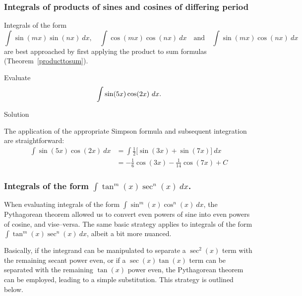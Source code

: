 \subsubsection{Integrals of products of sines and cosines of differing period}
Integrals of the form 
$$\int\sin(mx)\sin(nx)\ dx,\quad \int \cos(mx)\cos(nx)\ dx \quad \text{and}\quad\int \sin(mx)\cos(nx)\ dx$$
are best approached by first applying the product to sum formulas (Theorem~\ref{producttosum}).

\begin{example}\label{ex_trigint4}
Evaluate $$\displaystyle\int\sin(5x)\cos(2x)\ dx.$$

\pagebreak
{}Solution 

The application of the appropriate Simpson formula and subsequent integration are straightforward:
\begin{align*}
\int\sin(5x)\cos(2x)\ dx &= \int \frac12\Big[\sin(3x)+\sin(7x)\Big]\ dx \\[0.2cm]
												&= -\frac16\cos(3x) - \frac1{14}\cos(7x) + C
\end{align*}
\end{example}

\subsubsection{Integrals of the form $\int\tan^m(x)\sec^n(x)\ dx$.}
When evaluating integrals of the form $\int \sin^m(x)\cos^n(x)\ dx$, the Pythagorean theorem allowed us to convert even powers of sine into even powers of cosine, and vise--versa. The same basic strategy applies to integrals of the form $\int \tan^m(x)\sec^n(x)\ dx$, albeit a bit more nuanced.

Basically, if the integrand can be manipulated to separate a $\sec^2(x)$ term with the remaining secant power even, or if a $\sec (x)\tan (x)$ term can be separated with the remaining $\tan (x)$ power even, the Pythagorean theorem can be employed, leading to a simple substitution. This strategy is outlined below.


